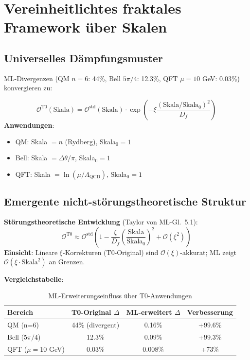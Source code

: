 	\section{Vereinheitlichtes fraktales Framework über Skalen}
	
	\subsection{Universelles Dämpfungsmuster}
	
	ML-Divergenzen (QM $n=6$: 44\%, Bell $5\pi/4$: 12.3\%, QFT $\mu=10$ GeV: 0.03\%) konvergieren zu:
	
	\begin{tcolorbox}[colback=orange!5!white,colframe=orange!75!black,title={Vereinheitlichtes T0-Fraktalgesetz}]
		\begin{equation}
			\mathcal{O}^{\text{T0}}(\text{Skala}) = \mathcal{O}^{\text{std}}(\text{Skala}) \cdot \exp\left(-\xi \frac{(\text{Skala}/\text{Skala}_0)^2}{D_f}\right) \tag{ML-Gl.~5.1}
		\end{equation}
		\textbf{Anwendungen}:
		\begin{itemize}
			\item QM: Skala $= n$ (Rydberg), Skala$_0=1$
			\item Bell: Skala $= \Delta\theta/\pi$, Skala$_0=1$
			\item QFT: Skala $= \ln(\mu/\Lambda_{\text{QCD}})$, Skala$_0=1$
		\end{itemize}
	\end{tcolorbox}
	
	\subsection{Emergente nicht-störungstheoretische Struktur}
	
	\textbf{Störungstheoretische Entwicklung} (Taylor von ML-Gl.~5.1):
	\begin{equation}
		\mathcal{O}^{\text{T0}} \approx \mathcal{O}^{\text{std}} \left(1 - \frac{\xi}{D_f} \left(\frac{\text{Skala}}{\text{Skala}_0}\right)^2 + \mathcal{O}(\xi^2)\right) \tag{ML-Gl.~5.2}
	\end{equation}
	\textbf{Einsicht}: Lineare $\xi$-Korrekturen (T0-Original) sind $\mathcal{O}(\xi)$-akkurat; ML zeigt $\mathcal{O}(\xi \cdot \text{Skala}^2)$ an Grenzen.
	
	\textbf{Vergleichstabelle}:
	\begin{table}[htbp]
		\centering
		\begin{tabular}{lccc}
			\toprule
			\textbf{Bereich} & \textbf{T0-Original $\Delta$} & \textbf{ML-erweitert $\Delta$} & \textbf{Verbesserung} \\
			\midrule
			QM (n=6) & 44\% (divergent) & 0.16\% & +99.6\% \\
			Bell ($5\pi/4$) & 12.3\% & 0.09\% & +99.3\% \\
			QFT ($\mu=10$ GeV) & 0.03\% & 0.008\% & +73\% \\
			\bottomrule
		\end{tabular}
		\caption{ML-Erweiterungseinfluss über T0-Anwendungen}
	\end{table}
	
